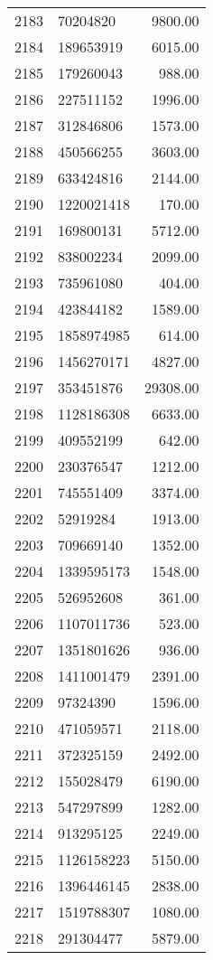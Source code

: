 \begin{table}[ht]
\begin{tabular}{rlr}
  2183 & 70204820 & 9800.00 \\ 
  2184 & 189653919 & 6015.00 \\ 
  2185 & 179260043 & 988.00 \\ 
  2186 & 227511152 & 1996.00 \\ 
  2187 & 312846806 & 1573.00 \\ 
  2188 & 450566255 & 3603.00 \\ 
  2189 & 633424816 & 2144.00 \\ 
  2190 & 1220021418 & 170.00 \\ 
  2191 & 169800131 & 5712.00 \\ 
  2192 & 838002234 & 2099.00 \\ 
  2193 & 735961080 & 404.00 \\ 
  2194 & 423844182 & 1589.00 \\ 
  2195 & 1858974985 & 614.00 \\ 
  2196 & 1456270171 & 4827.00 \\ 
  2197 & 353451876 & 29308.00 \\ 
  2198 & 1128186308 & 6633.00 \\ 
  2199 & 409552199 & 642.00 \\ 
  2200 & 230376547 & 1212.00 \\ 
  2201 & 745551409 & 3374.00 \\ 
  2202 & 52919284 & 1913.00 \\ 
  2203 & 709669140 & 1352.00 \\ 
  2204 & 1339595173 & 1548.00 \\ 
  2205 & 526952608 & 361.00 \\ 
  2206 & 1107011736 & 523.00 \\ 
  2207 & 1351801626 & 936.00 \\ 
  2208 & 1411001479 & 2391.00 \\ 
  2209 & 97324390 & 1596.00 \\ 
  2210 & 471059571 & 2118.00 \\ 
  2211 & 372325159 & 2492.00 \\ 
  2212 & 155028479 & 6190.00 \\ 
  2213 & 547297899 & 1282.00 \\ 
  2214 & 913295125 & 2249.00 \\ 
  2215 & 1126158223 & 5150.00 \\ 
  2216 & 1396446145 & 2838.00 \\ 
  2217 & 1519788307 & 1080.00 \\ 
  2218 & 291304477 & 5879.00 \\ 

\end{tabular}
\end{table}
